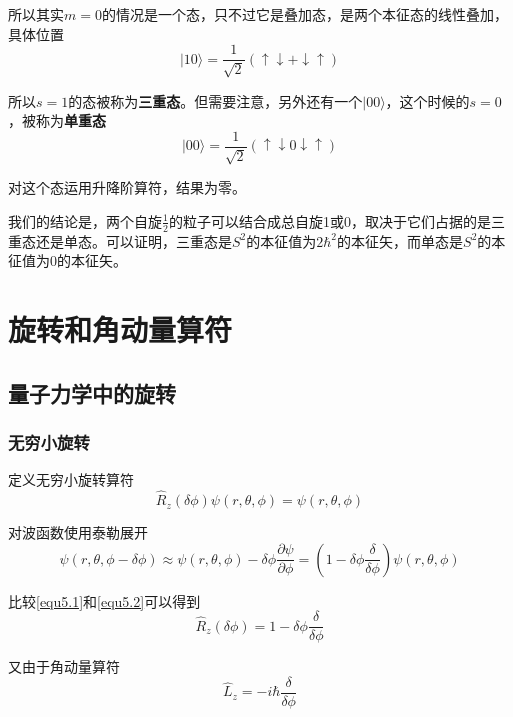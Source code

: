\documentclass[UTF8]{ctexart}
\begin{document}
    所以其实$m=0$的情况是一个态，只不过它是叠加态，是两个本征态的线性叠加，具体位置
    \begin{equation}
        | 1 0 \rangle = \frac{1}{\sqrt{2}} \left(\uparrow \downarrow + \downarrow \uparrow\right)
    \end{equation}

\noindent 所以$s=1$的态被称为\textbf{三重态}。但需要注意，另外还有一个$| 0 0 \rangle$，这个时候的$s=0$，被称为\textbf{单重态}
\begin{equation}
    | 0 0 \rangle = \frac{1}{\sqrt{2}} \left(\uparrow \downarrow 0 \downarrow \uparrow\right)
\end{equation}

\noindent 对这个态运用升降阶算符，结果为零。

    我们的结论是，两个自旋$\frac{1}{2}$的粒子可以结合成总自旋1或0，取决于它们占据的是三重态还是单态。可以证明，三重态是$S^2$的本征值为$2 \hbar^2$的本征矢，而单态是$S^2$的本征值为0的本征矢。

    \section{旋转和角动量算符}
    \subsection{量子力学中的旋转}
    \subsubsection{无穷小旋转}
    定义无穷小旋转算符
    \begin{equation}
        \hat{R}_z(\delta \phi) \psi(r,\theta,\phi) = \psi(r,\theta,\phi) \label{equ5.1}
    \end{equation}

\noindent 对波函数使用泰勒展开
\begin{equation}
    \psi(r,\theta,\phi-\delta \phi) \approx \psi(r,\theta,\phi)- \delta \phi \frac{\partial \psi}{\partial \phi} = \left(1-\delta \phi \frac{\delta}{\delta \phi}\right) \psi(r,\theta,\phi)\label{equ5.2}
\end{equation}

\noindent 比较\autoref{equ5.1}和\autoref{equ5.2}可以得到
\begin{equation}
    \hat{R}_z(\delta \phi) = 1 - \delta \phi \frac{\delta}{\delta \phi}
\end{equation}

\noindent 又由于角动量算符
\begin{equation}
    \hat{L}_z = - i \hbar \frac{\delta}{\delta \phi}
\end{equation}
\end{document}
